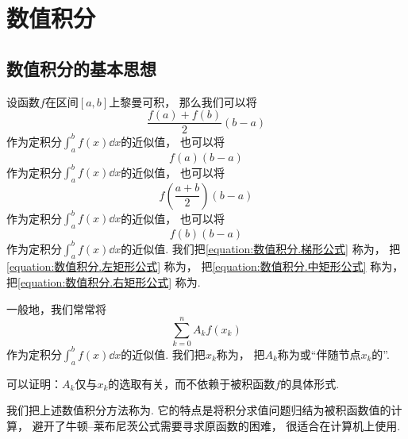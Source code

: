\section{数值积分}
\subsection{数值积分的基本思想}
设函数\(f\)在区间\([a,b]\)上黎曼可积，
那么我们可以将\begin{equation}\label{equation:数值积分.梯形公式}
	\frac{f(a) + f(b)}{2} (b-a)
\end{equation}
作为定积分\(\int_a^b f(x) \dd{x}\)的近似值，
也可以将\begin{equation}\label{equation:数值积分.左矩形公式}
	f(a) (b-a)
\end{equation}
作为定积分\(\int_a^b f(x) \dd{x}\)的近似值，
也可以将\begin{equation}\label{equation:数值积分.中矩形公式}
	f\left( \frac{a+b}{2} \right) (b-a)
\end{equation}
作为定积分\(\int_a^b f(x) \dd{x}\)的近似值，
也可以将\begin{equation}\label{equation:数值积分.右矩形公式}
	f(b) (b-a)
\end{equation}
作为定积分\(\int_a^b f(x) \dd{x}\)的近似值.
我们把\cref{equation:数值积分.梯形公式} 称为，
把\cref{equation:数值积分.左矩形公式} 称为，
把\cref{equation:数值积分.中矩形公式} 称为，
把\cref{equation:数值积分.右矩形公式} 称为.

一般地，我们常常将\begin{equation}\label{equation:数值积分.机械求积公式}
	\sum_{k=0}^n A_k f(x_k)
\end{equation}
作为定积分\(\int_a^b f(x) \dd{x}\)的近似值.
我们把\(x_k\)称为，
把\(A_k\)称为或“伴随节点\(x_k\)的”.

可以证明：\(A_k\)仅与\(x_k\)的选取有关，而不依赖于被积函数\(f\)的具体形式.

我们把上述数值积分方法称为.
它的特点是将积分求值问题归结为被积函数值的计算，
避开了牛顿--莱布尼茨公式需要寻求原函数的困难，
很适合在计算机上使用.

